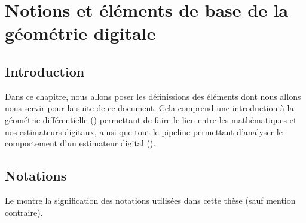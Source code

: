 %
\chapter{Notions et éléments de base de la géométrie digitale}
\label{sec:notions}


\setcounter{minitocdepth}{3}
\minitoc

\newpage
%
\section{Introduction}
%
Dans ce chapitre, nous allons poser les définissions des éléments dont nous allons nous servir pour la suite de ce document. Cela comprend une introduction à la géométrie différentielle () permettant de faire le lien entre les mathématiques et nos estimateurs digitaux, ainsi que tout le pipeline permettant d'analyser le comportement d'un estimateur digital ().
%
\section{Notations}
%
Le  montre la signification des notations utilisées
dans cette thèse (sauf mention contraire).

